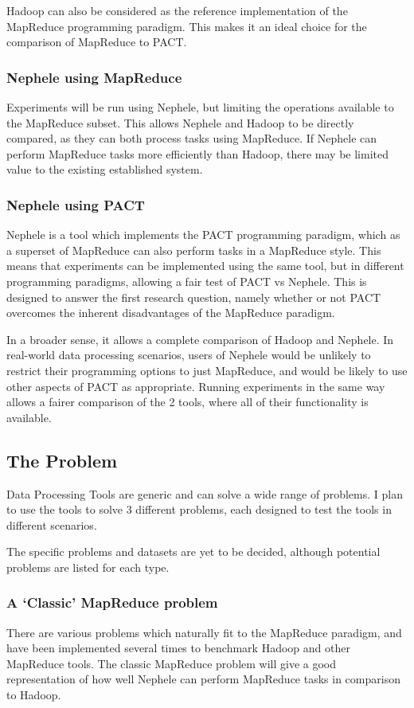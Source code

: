 Hadoop can also be considered as the reference implementation of the MapReduce programming paradigm. This makes it an ideal choice for the comparison of MapReduce to PACT.

\subsubsection{Nephele using MapReduce}
Experiments will be run using Nephele, but limiting the operations available to the MapReduce subset. This allows Nephele and Hadoop to be directly compared, as they can both process tasks using MapReduce. If Nephele can perform MapReduce tasks more efficiently than Hadoop, there may be limited value to the existing established system.

\subsubsection{Nephele using PACT}
Nephele is a tool which implements the PACT programming paradigm, which as a superset of MapReduce can also perform tasks in a MapReduce style. This means that experiments can be implemented using the same tool, but in different programming paradigms, allowing a fair test of PACT vs Nephele. This is designed to answer the first research question, namely whether or not PACT overcomes the inherent disadvantages of the MapReduce paradigm.

In a broader sense, it allows a complete comparison of Hadoop and Nephele. In real-world data processing scenarios, users of Nephele would be unlikely to restrict their programming options to just MapReduce, and would be likely to use other aspects of PACT as appropriate. Running experiments in the same way allows a fairer comparison of the 2 tools, where all of their functionality is available.

\subsection{The Problem}
Data Processing Tools are generic and can solve a wide range of problems. I plan to use the tools to solve 3 different problems, each designed to test the tools in different scenarios.

The specific problems and datasets are yet to be decided, although potential problems are listed for each type.

\subsubsection{A `Classic' MapReduce problem}
There are various problems which naturally fit to the MapReduce paradigm, and have been implemented several times to benchmark Hadoop and other MapReduce tools. The classic MapReduce problem will give a good representation of how well Nephele can perform MapReduce tasks in comparison to Hadoop.

